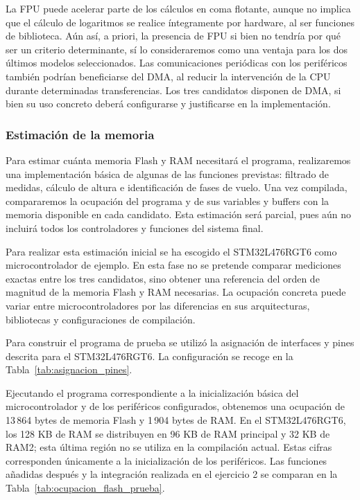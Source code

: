 \documentclass[11pt,a4paper]{article}
\begin{document}
La FPU puede acelerar parte de los cálculos en coma flotante, aunque no implica que el cálculo de logaritmos se realice íntegramente por hardware, al ser funciones de biblioteca. Aún así, a priori, la presencia de FPU si bien no tendría por qué ser un criterio determinante, sí lo consideraremos como una ventaja para los dos últimos modelos seleccionados. Las comunicaciones periódicas con los periféricos también podrían beneficiarse del DMA, al reducir la intervención de la CPU durante determinadas transferencias. Los tres candidatos disponen de DMA, si bien su uso concreto deberá configurarse y justificarse en la implementación.

\subsubsection{Estimación de la memoria}

Para estimar cuánta memoria Flash y RAM necesitará el programa,
realizaremos una implementación básica de algunas de las funciones
previstas: filtrado de medidas, cálculo de altura e identificación de
fases de vuelo. Una vez compilada, compararemos la ocupación del
programa y de sus variables y buffers con la memoria disponible en
cada candidato. Esta estimación será parcial, pues aún no incluirá
todos los controladores y funciones del sistema final.

Para realizar esta estimación inicial se ha escogido el
STM32L476RGT6 como microcontrolador de ejemplo. En esta fase no se
pretende comparar mediciones exactas entre los tres candidatos, sino
obtener una referencia del orden de magnitud de la memoria Flash y
RAM necesarias. La ocupación concreta puede variar entre
microcontroladores por las diferencias en sus arquitecturas,
bibliotecas y configuraciones de compilación.

Para construir el programa de prueba se utilizó la asignación de interfaces
y pines descrita para el STM32L476RGT6. La configuración se recoge en la
Tabla~\ref{tab:asignacion_pines}.

%
Ejecutando el programa correspondiente a la inicialización básica del
microcontrolador y de los periféricos configurados, obtenemos una ocupación
de 13\,864 bytes de memoria Flash y 1\,904 bytes de RAM\@. En el
STM32L476RGT6, los 128 KB de RAM se distribuyen en 96 KB de RAM principal
y 32 KB de RAM2; esta última región no se utiliza en la compilación actual.
Estas cifras corresponden únicamente a la inicialización de los periféricos.
Las funciones añadidas después y la integración realizada en el ejercicio 2
se comparan en la Tabla~\ref{tab:ocupacion_flash_prueba}.
\end{document}
